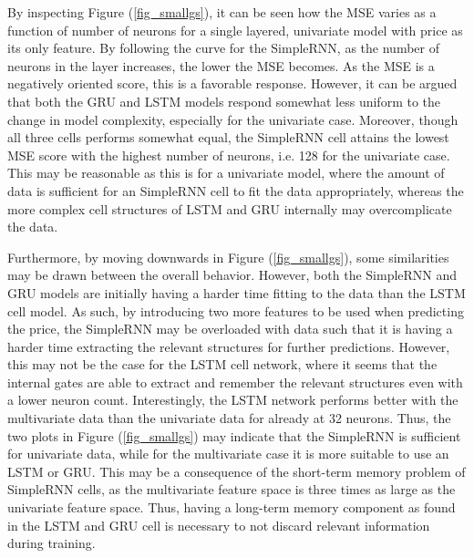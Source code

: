 \documentclass
[twocolumn,
secnumarabic,
nobibnotes,
aps,
prl,
reprint,
groupedaddress,
amsmath,
amssymb,
]{revtex4-2}
\begin{document}
By inspecting Figure (\ref{fig_smallgs}), it can be seen how the MSE varies as a function of number of neurons for a single layered, univariate model with price as its only feature. By following the curve for the SimpleRNN, as the number of neurons in the layer increases, the lower the MSE becomes. As the MSE is a negatively oriented score, this is a favorable response. However, it can be argued that both the GRU and LSTM models respond somewhat less uniform to the change in model complexity, especially for the univariate case. Moreover, though all three cells performs somewhat equal, the SimpleRNN cell attains the lowest MSE score with the highest number of neurons, i.e. 128 for the univariate case. This may be reasonable as this is for a univariate model, where the amount of data is sufficient for an SimpleRNN cell to fit the data appropriately, whereas the more complex cell structures of LSTM and GRU internally may overcomplicate the data. 

Furthermore, by moving downwards in Figure (\ref{fig_smallgs}), some similarities may be drawn between the overall behavior. However, both the SimpleRNN and GRU models are initially having a harder time fitting to the data than the LSTM cell model. As such, by introducing two more features to be used when predicting the price, the SimpleRNN may be overloaded with data such that it is having a harder time extracting the relevant structures for further predictions. However, this may not be the case for the LSTM cell network, where it seems that the internal gates are able to extract and remember the relevant structures even with a lower neuron count. Interestingly, the LSTM network performs better with the multivariate data than the univariate data for already at 32 neurons. Thus, the two plots in Figure (\ref{fig_smallgs}) may indicate that the SimpleRNN is sufficient for univariate data, while for the multivariate case it is more suitable to use an LSTM or GRU. This may be a consequence of the short-term memory problem of SimpleRNN cells, as the multivariate feature space is three times as large as the univariate feature space. Thus, having a long-term memory component as found in the LSTM and GRU cell is necessary to not discard relevant information during training.
\end{document}
